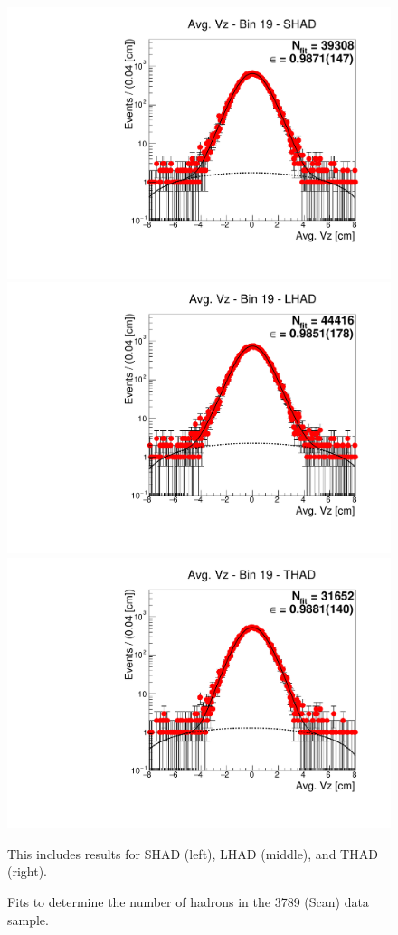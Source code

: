 \begin{figure}[H]
\centering
\includegraphics[scale=0.25]{figures/plots/nonDDbar_fit_results/scan/fit_scan_19_data_SHAD.pdf}
\hspace{-0.5cm}
\includegraphics[scale=0.25]{figures/plots/nonDDbar_fit_results/scan/fit_scan_19_data_LHAD.pdf}
\hspace{-0.5cm}
\includegraphics[scale=0.25]{figures/plots/nonDDbar_fit_results/scan/fit_scan_19_data_THAD.pdf}
\caption{Fits to determine the number of hadrons in the 3789 (Scan) data sample.}
{This includes results for SHAD (left), LHAD (middle), and THAD (right).}
\label{fig:hadron_fits_scan_19}
\end{figure}

